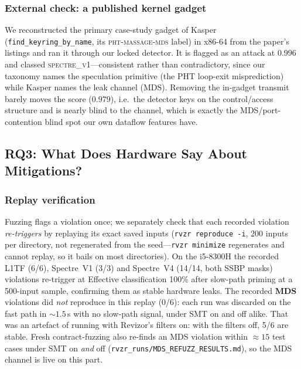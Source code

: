 \documentclass[conference]{IEEEtran}
\begin{document}
\subsubsection{External check: a published kernel gadget}
\label{sec:kasper-check}
We reconstructed the primary case-study gadget of Kasper~\cite{kasper}
(\texttt{find\_keyring\_by\_name}, its \textsc{pht-massage-mds} label) in x86-64
from the paper's listings and ran it through our locked detector. It is flagged
as an attack at $0.996$ and classed \textsc{spectre\_v1}---consistent rather
than contradictory, since our taxonomy names the speculation primitive (the PHT
loop-exit misprediction) while Kasper names the leak channel (MDS). Removing
the in-gadget transmit barely moves the score ($0.979$), i.e.\ the detector
keys on the control/access structure and is nearly blind to the channel, which
is exactly the MDS/port-contention blind spot our own dataflow features have.


\subsection{RQ3: What Does Hardware Say About Mitigations?}
\label{sec:rq-hw}

\subsubsection{Replay verification}
\label{sec:replay}
Fuzzing flags a violation once; we separately
check that each recorded violation \emph{re-triggers} by replaying its exact
saved inputs (\texttt{rvzr reproduce -i}, 200 inputs per directory, not regenerated
from the seed---\texttt{rvzr minimize} regenerates and cannot replay, so it
bails on most directories). On the i5-8300H the recorded L1TF (6/6), Spectre~V1 (3/3)
and Spectre~V4 (14/14, both SSBP masks) violations re-trigger at Effective
classification 100\% after slow-path priming at a 500-input sample, confirming
them as stable hardware leaks. The recorded \textbf{MDS} violations did
\emph{not} reproduce in this replay (0/6): each run was discarded on the fast
path in ${\sim}1.5$\,s
with no slow-path signal, under SMT on and off alike. That was an artefact of
running with Revizor's filters on: with the filters off, 5/6 are stable. Fresh
contract-fuzzing also re-finds an MDS violation within ${\approx}15$ test
cases under SMT on \emph{and} off (\texttt{rvzr\_runs/MDS\_REFUZZ\_RESULTS.md}),
so the MDS channel is live on this part.
\end{document}
